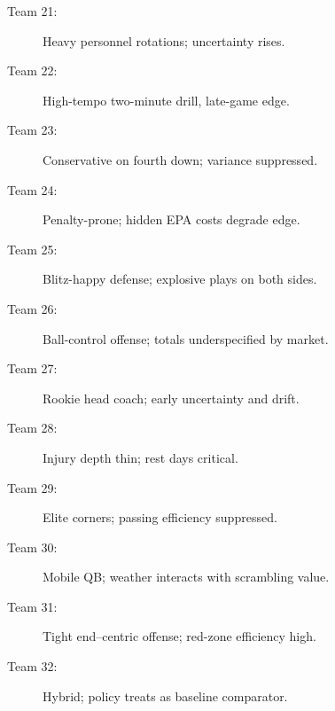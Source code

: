 \documentclass[12pt]{report}  %
\numberwithin{equation}{section}
\theoremstyle{plain}
\theoremstyle{definition}
\theoremstyle{remark}
\begin{document}
\begin{description}
  \item[Team 21:] Heavy personnel rotations; uncertainty rises.
  \item[Team 22:] High-tempo two-minute drill, late-game edge.
  \item[Team 23:] Conservative on fourth down; variance suppressed.
  \item[Team 24:] Penalty-prone; hidden EPA costs degrade edge.
  \item[Team 25:] Blitz-happy defense; explosive plays on both sides.
  \item[Team 26:] Ball-control offense; totals underspecified by market.
  \item[Team 27:] Rookie head coach; early uncertainty and drift.
  \item[Team 28:] Injury depth thin; rest days critical.
  \item[Team 29:] Elite corners; passing efficiency suppressed.
  \item[Team 30:] Mobile QB; weather interacts with scrambling value.
  \item[Team 31:] Tight end–centric offense; red-zone efficiency high.
  \item[Team 32:] Hybrid; policy treats as baseline comparator.
\end{description}
\end{document}
